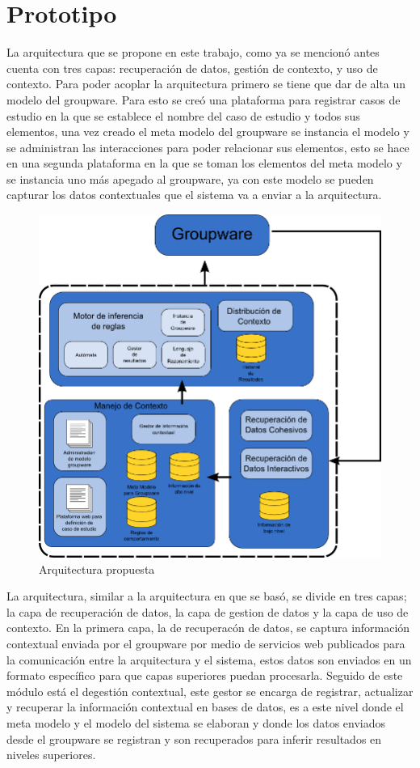 \section{Prototipo}
La arquitectura que se propone en este trabajo, como ya se mencion\'o antes cuenta con tres capas: recuperaci\'on de datos, gesti\'on de contexto, y uso de contexto. Para poder acoplar la arquitectura primero se tiene que dar de alta un modelo del groupware. Para esto se cre\'o una plataforma para registrar casos de estudio en la que se establece el nombre del caso de estudio y todos sus elementos, una vez creado el meta modelo del groupware se instancia el modelo y se administran las interacciones para poder relacionar sus elementos, esto se hace en una segunda plataforma en la que se toman los elementos del meta modelo y se instancia uno m\'as apegado al groupware, ya con este modelo se pueden capturar los datos contextuales que el sistema va a enviar a la arquitectura. 

\begin{figure}[h!]
\centering
\includegraphics[scale=0.40]{images/arqui2}
\caption{Arquitectura propuesta}
\label{ARCH:propuesta}
\end{figure}

La arquitectura, similar a la arquitectura en que se bas\'o, se divide en tres capas; la capa de recuperaci\'on de datos, la capa de gestion de datos y la capa de uso de contexto. En la primera capa, la de recuperac\'on de datos, se captura informaci\'on contextual enviada por el groupware por medio de servicios web publicados para la comunicaci\'on entre la arquitectura y el sistema, estos datos son enviados en un formato espec\'ifico para que capas superiores puedan procesarla. Seguido de este m\'odulo est\'a el degesti\'on contextual, este gestor se encarga de registrar, actualizar y recuperar la informaci\'on contextual en bases de datos, es a este nivel donde el meta modelo y el modelo del sistema se elaboran y donde los datos enviados desde el groupware se registran y son recuperados para inferir resultados en niveles superiores.


